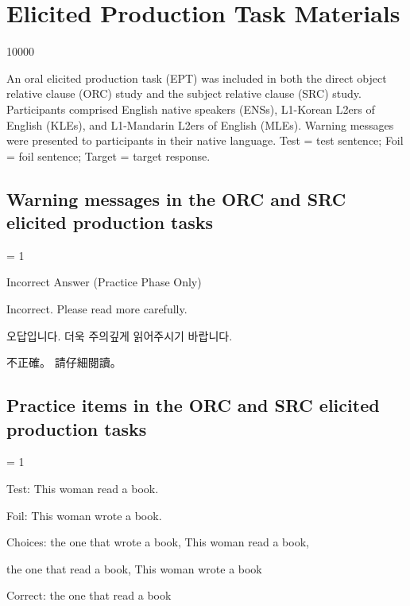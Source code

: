 
\chapter{Elicited Production Task Materials}\label{app-materials-ept}

 10000
\raggedbottom

An oral elicited production task (EPT) was included in both the direct object relative clause (ORC) study and the subject relative clause (SRC) study. Participants comprised English native speakers (ENSs), L1-Korean L2ers of English (KLEs), and L1-Mandarin L2ers of English (MLEs). Warning messages were presented to participants in their native language. Test = test sentence; Foil = foil sentence; Target = target response.

\section{Warning messages in the ORC and SRC elicited production tasks}


\excnt = 1

\ex %
Incorrect Answer (Practice Phase Only)\par\nobreak
Incorrect. Please read more carefully.\par\nobreak
\ko 오답입니다. 더욱 주의깊게 읽어주시기 바랍니다.\normalfont\par\nobreak
\zh 不正確。 請仔細閱讀。\normalfont
\xe

\section{Practice items in the ORC and SRC elicited production tasks}

\excnt = 1

\ex %
Test: This woman read a book.\par\nobreak
Foil: This woman wrote a book.\par\nobreak
Choices: the one that wrote a book, This woman read a book,\par\nobreak
the one that read a book, This woman wrote a book\par\nobreak
Correct: the one that read a book
\xe

